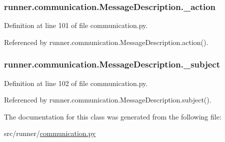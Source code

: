 \subsubsection[{\+\_\+action}]{\setlength{\rightskip}{0pt plus 5cm}runner.\+communication.\+Message\+Description.\+\_\+action\hspace{0.3cm}{\ttfamily [private]}}\label{classrunner_1_1communication_1_1MessageDescription_a9cec8aff1ff317cc2accd298d079e8ec}


Definition at line 101 of file communication.\+py.



Referenced by runner.\+communication.\+Message\+Description.\+action().

\hypertarget{classrunner_1_1communication_1_1MessageDescription_a9dc8593ec30b4b25b0ceac9f10d01242}{}
\subsubsection[{\+\_\+subject}]{\setlength{\rightskip}{0pt plus 5cm}runner.\+communication.\+Message\+Description.\+\_\+subject\hspace{0.3cm}{\ttfamily [private]}}\label{classrunner_1_1communication_1_1MessageDescription_a9dc8593ec30b4b25b0ceac9f10d01242}


Definition at line 102 of file communication.\+py.



Referenced by runner.\+communication.\+Message\+Description.\+subject().



The documentation for this class was generated from the following file\+:\begin{DoxyCompactItemize}
\item 
src/runner/\hyperlink{communication_8py}{communication.\+py}\end{DoxyCompactItemize}
